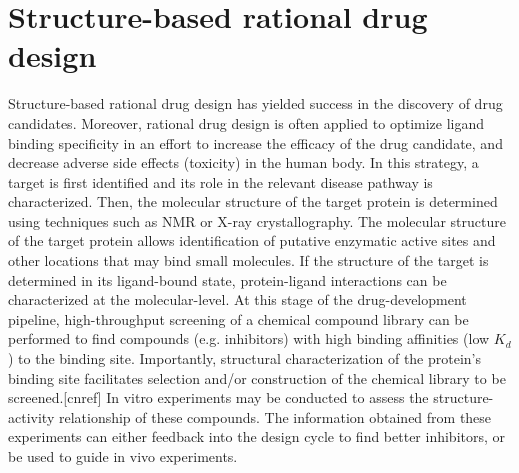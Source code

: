 \section{Structure-based rational drug design}
Structure-based rational drug design has yielded success in the discovery of drug candidates.\cite{Wlodawer:2002tt,Hubbard:2011fs}
Moreover, rational drug design is often applied to optimize ligand binding specificity in an effort to increase the efficacy of the drug candidate, and decrease adverse side effects (toxicity) in the human body.
In this strategy, a target is first identified and its role in the relevant disease pathway is characterized. Then, the molecular structure of the target protein is determined using techniques such as NMR or X-ray crystallography.  The molecular structure of the target protein allows identification of putative enzymatic active sites and other locations that may bind small molecules.  If the structure of the target is determined in its ligand-bound state, protein-ligand interactions can be characterized at the molecular-level. At this stage of the drug-development pipeline, high-throughput screening of a chemical compound library can be performed to find compounds (e.g. inhibitors) with high binding affinities (low $K_d$) to the binding site. Importantly, structural characterization of the protein's binding site facilitates selection and/or construction of the chemical library to be screened.[cnref] In vitro experiments may be conducted to assess the structure-activity relationship of these compounds.  The information obtained from these experiments can either feedback into the design cycle to find better inhibitors, or be used to guide in vivo experiments.


